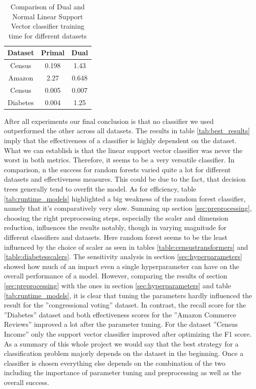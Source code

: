 \documentclass[a4paper,10pt]{article}
\begin{document}
\begin{table}[h!]
\centering
\begin{tabular}{|c|c|c|}
\hline
\textbf{Dataset} & \textbf{Primal} & \textbf{Dual} \\
\hline
Census & 0.198 & 1.43 \\
\hline
Amazon & 2.27 & 0.648 \\
\hline
Census & 0.005 & 0.007 \\
\hline
Diabetes & 0.004 & 1.25 \\
\hline
\end{tabular}
\vspace{0.3cm}
\caption{Comparison of Dual and Normal Linear Support Vector classifier training time for different datasets}
\label{tab:dual_comparison}
\end{table}
After all experiments our final conclusion is that no classifier we used outperformed the other across all
datasets. The results in table \ref{tab:best_results} imply that the effectiveness of a classifier is highly dependent on the
dataset. What we can establish is that the linear support vector classifier was never the worst in both
metrics. Therefore, it seems to be a very versatile classifier. In comparison, n the success for random forests
varied quite a lot for different datasets and effectiveness measures. This could be due to the fact, that
decision trees generally tend to overfit the model. As for efficiency, table \ref{tab:runtime_models} highlighted a big weakness of
the random forest classifier, namely that it’s comparatively very slow. Summing up section \ref{sec:preprocessing}, choosing
the right preprocessing steps, especially the scaler and dimension reduction, influences the results notably,
though in varying magnitude for different classifiers and datasets. Here random forest seems to be the
least influenced by the choice of scaler as seen in tables \ref{table:censustransformers} and \ref{table:diabetesscalers}. The sensitivity analysis in section \ref{sec:hyperparameters}
showed how much of an impact even a single hyperparameter can have on the overall performance of a
model. However, comparing the results of section \ref{sec:preprocessing} with the ones in section \ref{sec:hyperparameters} and table \ref{tab:runtime_models}, it is clear that
tuning the parameters hardly influenced the result for the ”congressional voting” dataset. In contrast, the
recall score for the ”Diabetes” dataset and both effectiveness scores for the ”Amazon Commerce Reviews”
improved a lot after the parameter tuning. For the dataset ”Census Income” only the support vector
classifier improved after optimizing the F1 score. As a summary of this whole project we would say that
the best strategy for a classification problem majorly depends on the dataset in the beginning. Once a
classifier is chosen everything else depends on the combination of the two including the importance of
parameter tuning and preprocessing as well as the overall success.
\end{document}

